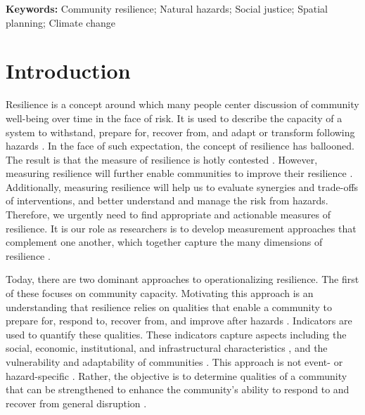 \documentclass[onecolumn,doublespacing]{risa}
\let \cite \parencite
\begin{document}
\textbf{Keywords:} Community resilience; Natural hazards; Social justice; Spatial planning; Climate change
\newpage

\section{Introduction}
Resilience is a concept around which many people center discussion of community well-being over time in the face of risk.
It is used to describe the capacity of a system to withstand, prepare for, recover from, and adapt or transform following hazards \cite{Bene2012-mx, Meerow2016-definingRes, GillespieMarthaler2019-ak}.
In the face of such expectation, the concept of resilience has ballooned. 
The result is that the measure of resilience is hotly contested \cite{Levine2014-je, Woolf2016-vm, Klein2003-lc}.
However, measuring resilience will further enable communities to improve their resilience \cite{Cutter2013-hq}.
Additionally, measuring resilience will help us to evaluate synergies and trade-offs of interventions, and better understand and manage the risk from hazards.
Therefore, we urgently need to find appropriate and actionable measures of resilience.
It is our role as researchers is to develop measurement approaches that complement one another, which together capture the many dimensions of resilience \cite{Bruneau2003-px, Sharma2018-rs, Haimes2009-gj, Levine2014-je, Cutter2014-jm, Cutter2016-landscape}.

Today, there are two dominant approaches to operationalizing resilience.
The first of these focuses on community capacity.
Motivating this approach is an understanding that resilience relies on qualities that enable a community to prepare for, respond to, recover from, and improve after hazards \cite{Cutter2014-jm, Zautra2008-rb}.
Indicators are used to quantify these qualities.
These indicators capture aspects including the social, economic, institutional, and infrastructural characteristics \cite{Cutter2014-jm, Cutter2010-vg, Cutter2016-landscape, Sherrieb2010-nk}, and the vulnerability and adaptability of communities \cite{Lam2016-qn}.
This approach is not event- or hazard-specific \cite{Koliou2018-jt}.
Rather, the objective is to determine qualities of a community that can be strengthened to enhance the community's ability to respond to and recover from general disruption \cite{Cutter2014-jm, Cutter2010-vg, Sherrieb2010-nk}. 
\end{document}
